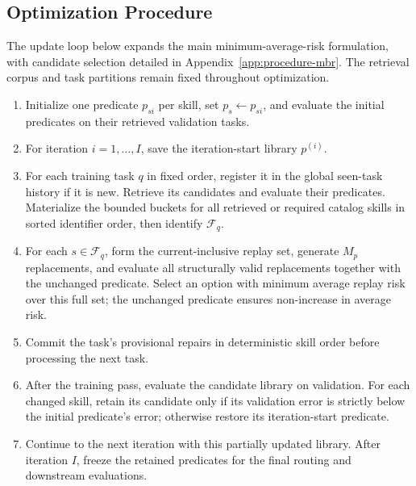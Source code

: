 \subsection{Optimization Procedure}
\label{app:procedure-algorithm}
The update loop below expands the main minimum-average-risk formulation, with candidate selection detailed in Appendix~\ref{app:procedure-mbr}. The retrieval corpus and task partitions remain fixed throughout optimization.
\begin{enumerate}
\item Initialize one predicate $p_{si}$ per skill, set $p_s\leftarrow p_{si}$, and evaluate the initial predicates on their retrieved validation tasks.
\item For iteration $i=1,\ldots,I$, save the iteration-start library $p^{(i)}$.
\item For each training task $q$ in fixed order, register it in the global seen-task history if it is new. Retrieve its candidates and evaluate their predicates. Materialize the bounded buckets for all retrieved or required catalog skills in sorted identifier order, then identify $\mathcal F_q$.
\item For each $s\in\mathcal F_q$, form the current-inclusive replay set, generate $M_p$ replacements, and evaluate all structurally valid replacements together with the unchanged predicate. Select an option with minimum average replay risk over this full set; the unchanged predicate ensures non-increase in average risk.
\item Commit the task's provisional repairs in deterministic skill order before processing the next task.
\item After the training pass, evaluate the candidate library on validation. For each changed skill, retain its candidate only if its validation error is strictly below the initial predicate's error; otherwise restore its iteration-start predicate.
\item Continue to the next iteration with this partially updated library. After iteration $I$, freeze the retained predicates for the final routing and downstream evaluations.
\end{enumerate}
